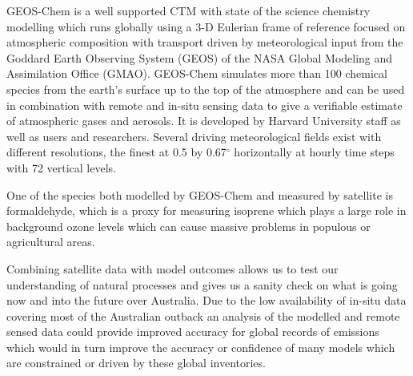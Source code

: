 GEOS-Chem is a well supported CTM with state of the science chemistry modelling which runs globally using a 3-D Eulerian frame of reference focused on atmospheric composition with transport driven by meteorological input from the Goddard Earth Observing System (GEOS) of the NASA Global Modeling and Assimilation Office (GMAO).
GEOS-Chem simulates more than 100 chemical species from the earth's surface up to the top of the atmosphere and can be used in combination with remote and in-situ sensing data to give a verifiable estimate of atmospheric gases and aerosols.
It is developed by Harvard University staff as well as users and researchers. 
Several driving meteorological fields exist with different resolutions, the finest at 0.5 by 0.67$^\circ$ horizontally at hourly time steps with 72 vertical levels.

One of the species both modelled by GEOS-Chem and measured by satellite is formaldehyde, which is a proxy for measuring isoprene which plays a large role in background ozone levels which can cause massive problems in populous or agricultural areas.

Combining satellite data with model outcomes allows us to test our understanding of natural processes and gives us a sanity check on what is going now and into the future over Australia.
Due to the low availability of in-situ data covering most of the Australian outback an analysis of the modelled and remote sensed data could provide improved accuracy for global records of emissions which would in turn improve the accuracy or confidence of many models which are constrained or driven by these global inventories.
